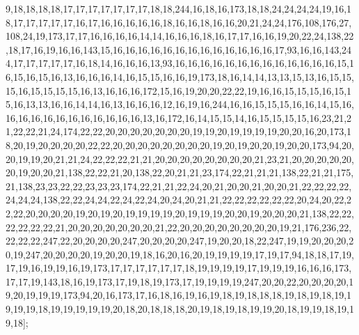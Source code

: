 9,18,18,18,18,17,17,17,17,17,17,17,18,18,244,16,18,16,173,18,18,24,24,24,24,19,16,18,17,17,17,17,17,16,17,16,16,16,16,16,18,16,16,18,16,16,20,21,24,24,176,108,176,27,108,24,19,173,17,17,16,16,16,16,14,14,16,16,16,18,16,17,17,16,16,19,20,22,24,138,22,18,17,16,19,16,16,143,15,16,16,16,16,16,16,16,16,16,16,16,16,16,17,93,16,16,143,244,17,17,17,17,17,16,18,14,16,16,16,13,93,16,16,16,16,16,16,16,16,16,16,16,16,16,15,16,15,16,15,16,13,16,16,16,14,16,15,15,16,16,19,173,18,16,14,14,13,13,15,13,16,15,15,15,16,15,15,15,15,16,13,16,16,16,172,15,16,19,20,20,22,22,19,16,16,15,15,15,16,15,15,16,13,13,16,16,14,14,16,13,16,16,16,12,16,19,16,244,16,16,15,15,15,16,16,14,15,16,16,16,16,16,16,16,16,16,16,16,16,13,16,172,16,14,15,15,14,16,15,15,15,15,16,23,21,21,22,22,21,24,174,22,22,20,20,20,20,20,20,20,19,19,20,19,19,19,19,20,20,16,20,173,18,20,19,20,20,20,20,22,22,20,20,20,20,20,20,20,20,19,20,19,20,20,19,20,20,173,94,20,20,19,19,20,21,21,24,22,22,22,21,21,20,20,20,20,20,20,20,20,21,23,21,20,20,20,20,20,20,19,20,20,21,138,22,22,21,20,138,22,20,21,21,23,174,22,21,21,21,138,22,21,21,175,21,138,23,23,22,22,23,23,23,174,22,21,21,22,24,20,21,20,20,21,20,20,21,22,22,22,22,24,24,24,138,22,22,24,24,22,24,22,24,20,24,20,21,21,22,22,22,22,22,22,20,24,20,22,22,22,20,20,20,20,19,20,19,20,19,19,19,19,20,19,19,19,20,20,19,20,20,20,21,138,22,22,22,22,22,22,21,20,20,20,20,20,20,20,21,22,20,20,20,20,20,20,20,20,19,21,176,236,22,22,22,22,247,22,20,20,20,20,247,20,20,20,20,247,19,20,20,18,22,247,19,19,20,20,20,20,19,247,20,20,20,20,19,20,20,19,18,16,20,16,20,19,19,19,19,17,19,17,94,18,18,17,19,17,19,16,19,19,16,19,173,17,17,17,17,17,17,18,19,19,19,19,17,19,19,19,16,16,16,173,17,17,19,143,18,16,19,173,17,19,18,19,173,17,19,19,19,19,247,20,20,22,20,20,20,20,19,20,19,19,19,173,94,20,16,173,17,16,18,16,19,16,19,18,19,18,18,18,19,18,19,18,19,19,19,19,18,19,19,19,19,19,20,18,20,18,18,18,20,19,18,19,18,19,19,20,18,19,19,18,19,19,18];

